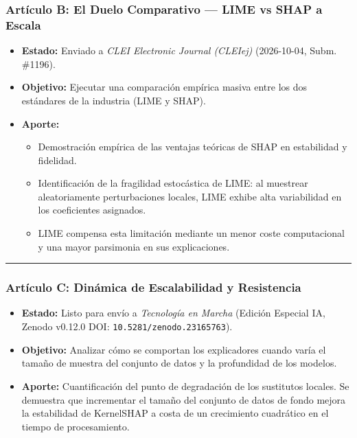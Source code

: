 \documentclass[
]{article}
\providecommand{\tightlist}{%
  \setlength{\itemsep}{0pt}\setlength{\parskip}{0pt}}
\begin{document}
\subsubsection{Artículo B: El Duelo Comparativo --- LIME vs SHAP a
Escala}\label{artuxedculo-b-el-duelo-comparativo-lime-vs-shap-a-escala}

\begin{itemize}
\tightlist
\item
  \textbf{Estado:} Enviado a \emph{CLEI Electronic Journal (CLEIej)}
  (2026-10-04, Subm. \#1196).
\item
  \textbf{Objetivo:} Ejecutar una comparación empírica masiva entre los
  dos estándares de la industria (LIME y SHAP).
\item
  \textbf{Aporte:}

  \begin{itemize}
  \tightlist
  \item
    Demostración empírica de las ventajas teóricas de SHAP en
    estabilidad y fidelidad.
  \item
    Identificación de la fragilidad estocástica de LIME: al muestrear
    aleatoriamente perturbaciones locales, LIME exhibe alta variabilidad
    en los coeficientes asignados.
  \item
    LIME compensa esta limitación mediante un menor coste computacional
    y una mayor parsimonia en sus explicaciones.
  \end{itemize}
\end{itemize}

\begin{center}\rule{0.5\linewidth}{0.5pt}\end{center}

\subsubsection{Artículo C: Dinámica de Escalabilidad y
Resistencia}\label{artuxedculo-c-dinuxe1mica-de-escalabilidad-y-resistencia}

\begin{itemize}
\tightlist
\item
  \textbf{Estado:} Listo para envío a \emph{Tecnología en Marcha}
  (Edición Especial IA, Zenodo v0.12.0 DOI:
  \texttt{10.5281/zenodo.23165763}).
\item
  \textbf{Objetivo:} Analizar cómo se comportan los explicadores cuando
  varía el tamaño de muestra del conjunto de datos y la profundidad de
  los modelos.
\item
  \textbf{Aporte:} Cuantificación del punto de degradación de los
  sustitutos locales. Se demuestra que incrementar el tamaño del
  conjunto de datos de fondo mejora la estabilidad de KernelSHAP a costa
  de un crecimiento cuadrático en el tiempo de procesamiento.
\end{itemize}
\end{document}
